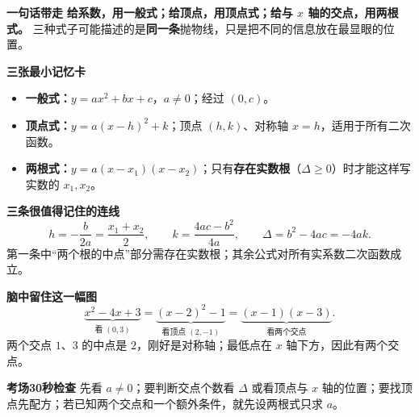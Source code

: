 \clearpage
\begin{summarybox}


\textbf{\textcolor{CSummary}{一句话带走}}
\textbf{给系数，用一般式；给顶点，用顶点式；给与 $x$ 轴的交点，用两根式。}
三种式子可能描述的是\textbf{同一条}抛物线，只是把不同的信息放在最显眼的位置。

\medskip
\textbf{\textcolor{CSummary}{三张最小记忆卡}}
\begin{itemize}[leftmargin=*,itemsep=0.4em,topsep=0.3em]
\item \textbf{一般式：}$y=ax^2+bx+c$，$a\ne0$；经过 $(0,c)$。
\item \textbf{顶点式：}$y=a(x-h)^2+k$；顶点 $(h,k)$、对称轴 $x=h$，适用于所有二次函数。
\item \textbf{两根式：}$y=a(x-x_1)(x-x_2)$；只有\textbf{存在实数根}（$\Delta\ge0$）时才能这样写实数的 $x_1,x_2$。
\end{itemize}

\medskip
\textbf{\textcolor{CSummary}{三条很值得记住的连线}}
\[
\boxed{h=-\frac{b}{2a}=\frac{x_1+x_2}{2}},\qquad
\boxed{k=\frac{4ac-b^2}{4a}},\qquad
\boxed{\Delta=b^2-4ac=-4ak}.
\]
第一条中“两个根的中点”部分需存在实数根；其余公式对所有实系数二次函数成立。

\medskip
\textbf{\textcolor{CSummary}{脑中留住这一幅图}}
\[
\underbrace{x^2-4x+3}_{\text{看 }(0,3)}
=\underbrace{(x-2)^2-1}_{\text{看顶点 }(2,-1)}
=\underbrace{(x-1)(x-3)}_{\text{看两个交点}}.
\]
两个交点 $1$、$3$ 的中点是 $2$，刚好是对称轴；最低点在 $x$ 轴下方，因此有两个交点。

\medskip
\textbf{\textcolor{CSummary}{考场30秒检查}}
先看 $a\ne0$；要判断交点个数看 $\Delta$ 或看顶点与 $x$ 轴的位置；要找顶点先配方；若已知两个交点和一个额外条件，就先设两根式只求 $a$。
\end{summarybox}

